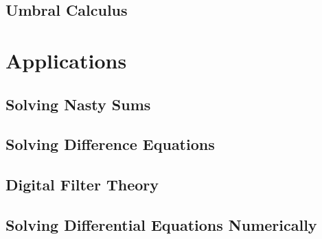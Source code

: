 
\subsection{Umbral Calculus}










\section{Applications}

\subsection{Solving Nasty Sums}

\subsection{Solving Difference Equations}

\subsection{Digital Filter Theory}


\subsection{Solving Differential Equations Numerically}







